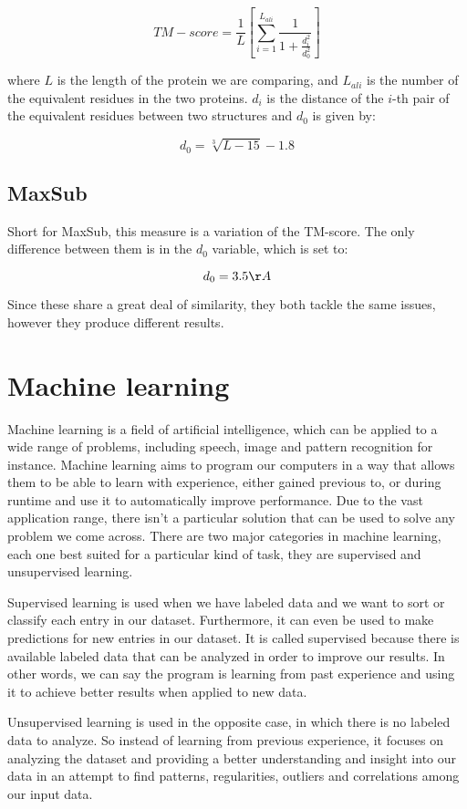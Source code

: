 $$TM-score = \frac{1}{L} \left[ \sum_{i=1}^{L_{ali}} \frac{1}{1 + \frac{d_i^2}{d_0^2}}\right]$$

where $L$ is the length of the protein we are comparing, and $L_{ali}$ is the number of the equivalent residues in the two proteins. $d_i$ is the distance of the $i$-th pair of the equivalent residues between two structures and $d_0$ is given by:

$$d_0 = \sqrt[3]{L-15}-1.8$$

\subsection{MaxSub}

Short for \gls{MaxSub}, this measure is a variation of the TM-score. The only difference between them is in the $d_0$ variable, which is set to:

$$d_0 = 3.5\AA$$ 

Since these share a great deal of similarity, they both tackle the same issues, however they produce different results. 

\section{Machine learning}
Machine learning \cite{tommitchell} \cite{ethemalpaydin2010} is a field of artificial intelligence, which can be applied to a wide range of problems, including speech, image and pattern recognition for instance. Machine learning aims to program our computers in a way that allows them to be able to learn with experience, either gained previous to, or during runtime and use it to automatically improve performance. Due to the vast application range, there isn't a particular solution that can be used to solve any problem we come across. There are two major categories in machine learning, each one best suited for a particular kind of task, they are supervised and unsupervised learning.

Supervised learning is used when we have labeled data and we want to sort or classify each entry in our dataset. Furthermore, it can even be used to make predictions for new entries in our dataset. It is called supervised because there is available labeled data that can be analyzed in order to improve our results. In other words, we can say the program is learning from past experience and using it to achieve better results when applied to new data.

Unsupervised learning is used in the opposite case, in which there is no labeled data to analyze. So instead of learning from previous experience, it focuses on analyzing the dataset and providing a better understanding and insight into our data in an attempt to find patterns, regularities, outliers and correlations among our input data.

